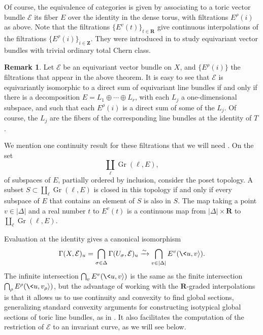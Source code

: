 \documentclass[12pt]{amsart}
\theoremstyle{definition}
\newtheorem{remark}[lemma]{Remark}
\theoremstyle{remark}
\begin{document}
Of course, the equivalence of categories is given by associating to
a toric vector bundle ${\mathcal{E}}$ its fiber $E$ over the identity in the
dense torus, with filtrations $E^\rho(i)$ as above. Note that the
filtrations $\{E^v(t)\}_{t\in{{\mathbf R}}}$ give continuous interpolations of
the filtrations $\{E^{\rho}(i)\}_{i\in{{\mathbf Z}}}$. They were introduced in
\cite{Payne} to study
 equivariant vector bundles with trivial ordinary total Chern class.

\begin{remark}\label{decomposable}
Let ${\mathcal{E}}$ be an equivariant vector bundle on $X$, and
$\{E^{\rho}(i)\}$ the filtrations that appear in the above theorem.
It is easy to see that ${\mathcal{E}}$ is equivariantly isomorphic to a direct
sum of equivariant line bundles if and only if there is a
decomposition $E=L_1\oplus\cdots\oplus L_r$, with each $L_j$ a
one-dimensional subspace, and such that each $E^{\rho}(i)$ is a
direct sum of some of the $L_j$. Of course, the $L_j$ are the fibers
of the corresponding line bundles at the identity of $T$.
\end{remark}

We mention one continuity result for these filtrations that we will
need \cite[Lem\-ma~4.7]{Payne}. On the set
\[
\coprod_{\ell} \operatorname{Gr}(\ell,E),
\]
of subspaces of $E$,
 partially ordered by inclusion, consider the poset topology.
A subset  $S \subset \coprod_{\ell} \operatorname{Gr}(\ell,E)$ is closed in this
topology if and only if every subspace of $E$ that contains an
element of $S$ is also in $S$.
 The map taking a point $v \in |\Delta|$ and a real number $t$ to
$E^v(t)$ is a continuous map from $|\Delta| \times {{\mathbf R}}$ to
$\coprod_{\ell} \operatorname{Gr}(\ell,E)$.

Evaluation at the identity gives a canonical isomorphism
\[
\Gamma(X, {\mathcal{E}})_u
=\bigcap_{\sigma\in\Delta}\Gamma(U_{\sigma},{\mathcal{E}})_u\xrightarrow{\sim}
\bigcap_{v \in |\Delta|} E^v(\<u,v{\rangle}).
\]
The infinite intersection $\bigcap_{v} E^v(\<u,v{\rangle})$ is the same as
the finite intersection $\bigcap_\rho E^\rho(\<u, v_\rho {\rangle})$, but
the advantage of working with the ${{\mathbf R}}$-graded interpolations is
that it allows us to use continuity and convexity to find global
sections, generalizing standard convexity arguments for constructing
isotypical global sections of toric line bundles, as in
\cite[Section~3.4]{Fulton}.
 It also facilitates the computation of the restriction of ${\mathcal{E}}$ to an invariant curve, as we will see below.
\end{document}
